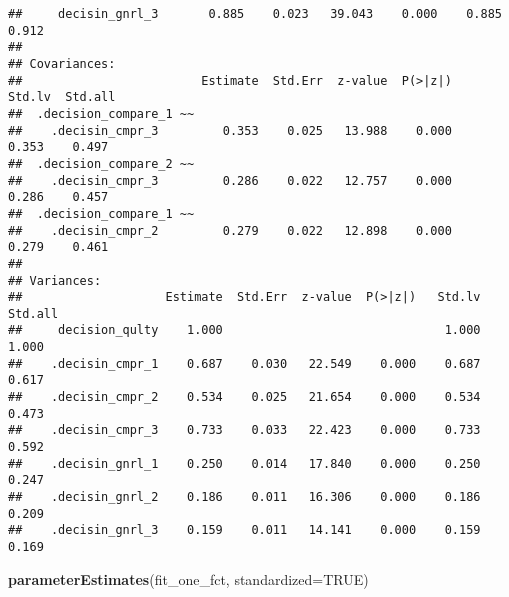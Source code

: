 \documentclass[]{article}
\newenvironment{Shaded}{\begin{snugshade}}{\end{snugshade}}
\newcommand{\DataTypeTok}[1]{\textcolor[rgb]{0.13,0.29,0.53}{#1}}
\newcommand{\KeywordTok}[1]{\textcolor[rgb]{0.13,0.29,0.53}{\textbf{#1}}}
\newcommand{\NormalTok}[1]{#1}
\newcommand{\OtherTok}[1]{\textcolor[rgb]{0.56,0.35,0.01}{#1}}
\begin{document}
\begin{verbatim}
##     decisin_gnrl_3       0.885    0.023   39.043    0.000    0.885    0.912
## 
## Covariances:
##                         Estimate  Std.Err  z-value  P(>|z|)   Std.lv  Std.all
##  .decision_compare_1 ~~                                                      
##    .decisin_cmpr_3         0.353    0.025   13.988    0.000    0.353    0.497
##  .decision_compare_2 ~~                                                      
##    .decisin_cmpr_3         0.286    0.022   12.757    0.000    0.286    0.457
##  .decision_compare_1 ~~                                                      
##    .decisin_cmpr_2         0.279    0.022   12.898    0.000    0.279    0.461
## 
## Variances:
##                    Estimate  Std.Err  z-value  P(>|z|)   Std.lv  Std.all
##     decision_qulty    1.000                               1.000    1.000
##    .decisin_cmpr_1    0.687    0.030   22.549    0.000    0.687    0.617
##    .decisin_cmpr_2    0.534    0.025   21.654    0.000    0.534    0.473
##    .decisin_cmpr_3    0.733    0.033   22.423    0.000    0.733    0.592
##    .decisin_gnrl_1    0.250    0.014   17.840    0.000    0.250    0.247
##    .decisin_gnrl_2    0.186    0.011   16.306    0.000    0.186    0.209
##    .decisin_gnrl_3    0.159    0.011   14.141    0.000    0.159    0.169
\end{verbatim}

\begin{Shaded}
\begin{Highlighting}[]
\KeywordTok{parameterEstimates}\NormalTok{(fit_one_fct, }\DataTypeTok{standardized=}\OtherTok{TRUE}\NormalTok{) }
\end{Highlighting}
\end{Shaded}
\end{document}
